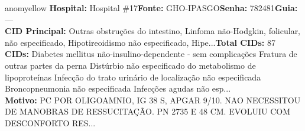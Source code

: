 \documentclass[a4paper,10pt]{article}
\begin{document}
\begin{anomalycard}[Interna\c{c}\~{a}o \#59 | Pac. \#103 | MODERADO (z=2.02) | LOS: 4d | 02/03/2026\,$\to$\,06/03/2026]{anomyellow}
\textbf{Hospital:} Hospital \#17\quad \textbf{Fonte:} GHO-IPASGO\quad \textbf{Senha:} 782481\quad \textbf{Guia:} ---\\

\textbf{CID Principal:} {\small Outras obstruções do intestino, Linfoma não-Hodgkin, folicular, não especificado, Hipotireoidismo não especificado, Hipe...}\quad\textbf{Total CIDs:} 87\\

\textbf{CIDs:} {\scriptsize Diabetes mellitus não-insulino-dependente - sem complicações \textbar{} Fratura de outras partes da perna \textbar{} Distúrbio não especificado do metabolismo de lipoproteínas \textbar{} Infecção do trato urinário de localização não especificada \textbar{} Broncopneumonia não especificada \textbar{} Infecções agudas não esp...}\\

\textbf{Motivo:} {\scriptsize PC POR OLIGOAMNIO, IG 38 S, APGAR 9/10. NAO NECESSITOU DE MANOBRAS DE RESSUCITAÇÃO. PN 2735 E 48 CM. EVOLUIU COM DESCONFORTO RES...}\\




\end{anomalycard}
\end{document}
